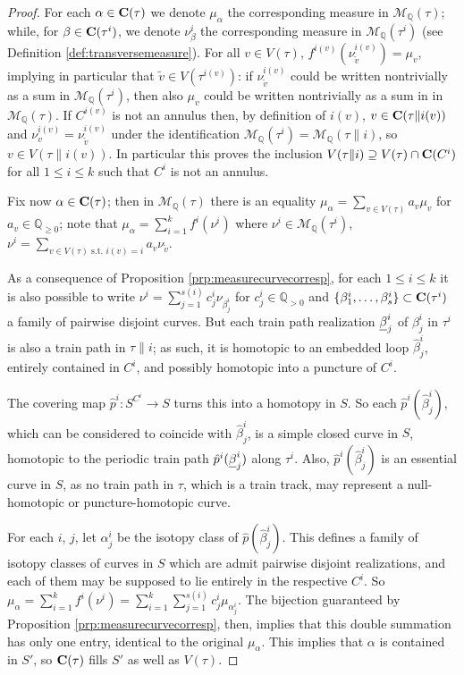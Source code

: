 \begin{proof}
For each $\alpha\in\mathbf C(\tau)$ we denote $\mu_\alpha$ the corresponding measure in ${\mathcal M}_{\mathbb Q}(\tau)$; while, for $\beta\in\mathbf C(\tau^i)$, we denote $\nu^i_\beta$ the corresponding measure in ${\mathcal M}_{\mathbb Q}(\tau^i)$ (see Definition \ref{def:transversemeasure}). For all $v\in V(\tau)$, $f^{i(v)}(\nu^{i(v)}_{\tilde v})=\mu_v$, implying in particular that $\tilde v\in V(\tau^{i(v)})$: if $\nu^{i(v)}_{\tilde v}$ could be written nontrivially as a sum in ${\mathcal M}_{\mathbb Q}(\tau^i)$, then also $\mu_v$ could be written nontrivially as a sum in in ${\mathcal M}_{\mathbb Q}(\tau)$. If $C^{i(v)}$ is not an annulus then, by definition of $i(v)$, $v\in \mathbf C(\tau\|i(v))$ and $\nu^{i(v)}_v=\nu^{i(v)}_{\tilde v}$ under the identification ${\mathcal M}_{\mathbb Q}(\tau^i)={\mathcal M}_{\mathbb Q}(\tau\|i)$, so $v\in V(\tau\|i(v))$. In particular this proves the inclusion $V(\tau\|i)\supseteq V(\tau)\cap \mathbf C(C^i)$ for all $1\leq i\leq k$ such that $C^i$ is not an annulus.

Fix now $\alpha\in \mathbf C(\tau)$; then in ${\mathcal M}_{\mathbb Q}(\tau)$ there is an equality $\mu_\alpha=\sum_{v\in V(\tau)} a_v\mu_v$ for $a_v\in {\mathbb Q}_{\geq 0}$; note that $\mu_\alpha=\sum_{i=1}^k f^i(\nu^i)$ where $\nu^i\in {\mathcal M}_{\mathbb Q}(\tau^i)$, $\nu^i= \sum_{v\in V(\tau) \text{ s.t. } i(v)=i} a_v\nu_{\tilde v}$.

As a consequence of Proposition \ref{prp:measurecurvecorresp}, for each $1\leq i\leq k$ it is also possible to write $\nu^i=\sum_{j=1}^{s(i)} c^i_j \nu_{\beta^i_j}$ for $c^i_j\in{\mathbb Q}_{> 0}$ and $\{\beta^i_1,\ldots,\beta^i_s\}\subset \mathbf C(\tau^i)$ a family of pairwise disjoint curves. But each train path realization $\underline{\beta}^i_j$ of $\beta^i_j$ in $\tau^i$ is also a train path in $\tau\|i$; as such, it is homotopic to an embedded loop $\hat \beta^i_j$, entirely contained in $C^i$, and possibly homotopic into a puncture of $C^i$.

The covering map $\hat p^i:S^{C^i}\rightarrow S$ turns this into a homotopy in $S$. So each $\hat p^i(\hat \beta^i_j)$, which can be considered to coincide with $\hat \beta^i_j$, is a simple closed curve in $S$, homotopic to the periodic train path $\hat p^i(\underline{\beta}^i_j)$ along $\tau^i$. Also, $\hat p^i(\hat \beta^i_j)$ is an essential curve in $S$, as no train path in $\tau$, which is a train track, may represent a null-homotopic or puncture-homotopic curve.

For each $i$, $j$, let $\alpha^i_j$ be the isotopy class of $\hat p(\hat\beta^i_j)$. This defines a family of isotopy classes of curves in $S$ which are admit pairwise disjoint realizations, and each of them may be supposed to lie entirely in the respective $C^i$. So $\mu_\alpha=\sum_{i=1}^k f^i(\nu^i) = \sum_{i=1}^k \sum_{j=1}^{s(i)} c^i_j \mu_{\alpha^i_j}$. The bijection guaranteed by Proposition \ref{prp:measurecurvecorresp}, then, implies that this double summation has only one entry, identical to the original $\mu_\alpha$. This implies that $\alpha$ is contained in $S'$, so $\mathbf C(\tau)$ fills $S'$ as well as $V(\tau)$.


\end{proof}
